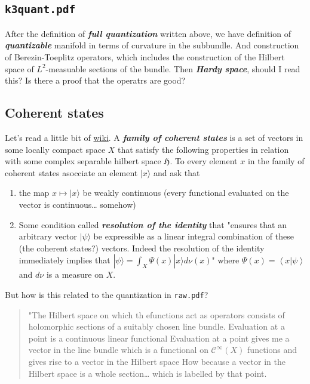 \subsection{\texttt{k3quant.pdf}}

After the definition of \textit{\textbf{full quantization}} written above, we have definition of \textit{\textbf{quantizable}} manifold in terms of curvature in the subbundle. And construction of Berezin-Toeplitz operators, which includes the construction of the Hilbert space of $L^2$-measuable sections of the bundle. Then \textit{\textbf{Hardy space}}, should I read this? Is there a proof that the operatrs are good?

\subsection{Coherent states}

Let's read a little bit of \href{https://en.wikipedia.org/wiki/Coherent_states_in_mathematical_physics}{wiki}. A \textit{\textbf{family of coherent states}} is a set of vectors in some locally compact space  $X$ that satisfy the following properties in relation with some complex separable hilbert space $\mathfrak{H}$. To every element $x$ in the family of coherent states asocciate an element $|x\rangle$ and ask that
\begin{enumerate}
	\item the map $x\mapsto |x\rangle$ be weakly continuous (every functional evaluated on the vector is continuous… somehow)

	\item Some condition called \textit{\textbf{resolution of the identity}} that "ensures that an arbitrary vector  $|\psi\rangle$ be expressible as a linear integral combination of these (the coherent states?) vectors. Indeed the resolution of the identity immediately implies that $|\psi\rangle=\int_{X}\Psi(x)|x\rangle d\nu(x)$" where $\Psi(x)=\left<x|\psi\right> $ and $d\nu$ is a measure on $X$.
\end{enumerate}

{\color{4}But how is this related to the quantization in \texttt{raw.pdf}}?

{\color{1}\begin{quotation}
		"The Hilbert space on which th efunctions act as operators consists of holomorphic sections of a suitably chosen line bundle. Evaluation at a point is a continuous linear functional {\color{3}Evaluation at a point gives me a vector in the line bundle which is a functional on $\mathcal{C}^\infty(X)$ functions} and gives rise to a vector in the Hilbert space {\color{3}How because a vector in the Hilbert space is a whole section…} which is labelled by that point.
\end{quotation}}

